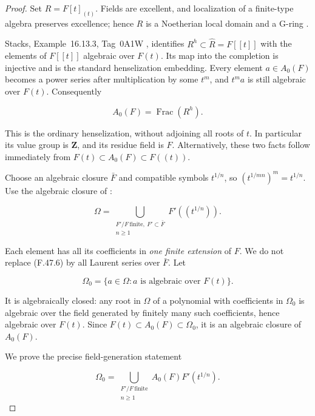 \begin{proof}
Set \(R=F[t]_{(t)}\). Fields are excellent, and localization of a finite-type algebra preserves excellence; hence \(R\) is a Noetherian local domain and a G-ring \citep[Tags~07QU and~07QW]{F_StacksHenselization}.

Stacks, Example~16.13.3, Tag~0A1W \citep{F_StacksHenselization}, identifies \(R^h\subset\widehat R=F[[t]]\) with the elements of \(F[[t]]\) algebraic over \(F(t)\). Its map into the completion is injective and is the standard henselization embedding. Every element \(a\in A_0(F)\) becomes a power series after multiplication by some \(t^m\), and \(t^m a\) is still algebraic over \(F(t)\). Consequently

\[
                         A_0(F)=\operatorname{Frac}(R^h).
 \tag{F.47.5}
\]

This is the ordinary henselization, without adjoining all roots of \(t\). In particular its value group is \(\mathbf Z\), and its residue field is \(F\). Alternatively, these two facts follow immediately from \(F(t)\subset A_0(F)\subset F((t))\).

Choose an algebraic closure \(\bar F\) and compatible symbols \(t^{1/n}\), so \((t^{1/mn})^m=t^{1/n}\). Use the algebraic closure of \citet[Proposition, p.~314]{F_vanDenDriesRibenboim1984}:

\[
 \Omega=
 \bigcup_{\substack{F'/F\ \mathrm{finite},\ F'\subset\bar F\\n\geq1}}
             F'((t^{1/n})).
 \tag{F.47.6}
\]

Each element has all its coefficients in \emph{one finite extension} of \(F\). We do not replace (F.47.6) by all Laurent series over \(\bar F\). Let

\[
 \Omega_0=\{a\in\Omega:a\text{ is algebraic over }F(t)\}.
\]

It is algebraically closed: any root in \(\Omega\) of a polynomial with coefficients in \(\Omega_0\) is algebraic over the field generated by finitely many such coefficients, hence algebraic over \(F(t)\). Since \(F(t)\subset A_0(F)\subset\Omega_0\), it is an algebraic closure of \(A_0(F)\).

We prove the precise field-generation statement

\[
 \Omega_0=
 \bigcup_{\substack{F'/F\ \mathrm{finite}\\n\geq1}}
                       A_0(F)F'(t^{1/n}).
 \tag{F.47.7}
\]


\end{proof}
